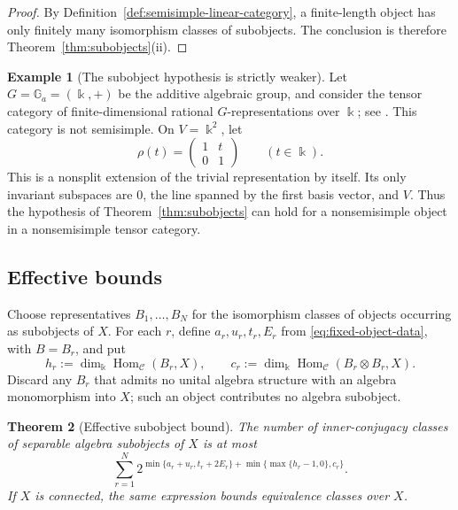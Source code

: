 \documentclass[11pt]{amsart}
\newtheorem{theorem}{Theorem}[section]
\theoremstyle{definition}
\newtheorem{example}[theorem]{Example}
\theoremstyle{remark}
\newcommand{\C}{\mathcal C}
\newcommand{\kk}{\Bbbk}
\DeclareMathOperator{\Hom}{Hom}
\begin{document}
\begin{proof}
By Definition~\ref{def:semisimple-linear-category}, a finite-length object
has only finitely many isomorphism classes of subobjects.  The conclusion is
therefore Theorem~\ref{thm:subobjects}\textup{(ii)}.
\end{proof}

\begin{example}[The subobject hypothesis is strictly weaker]\label{ex:strict-subobject}
Let $G=\mathbb G_a=(\kk,+)$ be the additive algebraic group, and consider
the tensor category of finite-dimensional rational $G$-representations over
$\kk$; see \cite[\S{}I.2]{Jantzen}.  This category is not semisimple.  On
$V=\kk^2$, let
\[
 \rho(t)=\begin{pmatrix}1&t\\0&1\end{pmatrix}\qquad(t\in\kk).
\]
This is a nonsplit extension of the trivial representation by itself.  Its
only invariant subspaces are $0$, the line spanned by the first basis vector,
and $V$.  Thus the hypothesis of Theorem~\ref{thm:subobjects} can hold for a
nonsemisimple object in a nonsemisimple tensor category.
\end{example}

\subsection*{Effective bounds}

Choose representatives $B_1,\ldots,B_N$ for the isomorphism classes of
objects occurring as subobjects of $X$.  For each $r$, define
$a_r,u_r,t_r,E_r$ from \eqref{eq:fixed-object-data}, with $B=B_r$, and put
\begin{equation}\label{eq:subobject-data}
 h_r:=\dim_{\kk}\Hom_{\C}(B_r,X),
 \qquad
 c_r:=\dim_{\kk}\Hom_{\C}(B_r\otimes B_r,X).
\end{equation}
Discard any $B_r$ that admits no unital algebra structure with an algebra
monomorphism into $X$; such an object contributes no algebra subobject.

\begin{theorem}[Effective subobject bound]\label{thm:subobject-bound}
The number of inner-conjugacy classes of separable algebra subobjects of
$X$ is at most
\begin{equation}\label{eq:subobject-bound}
 \sum_{r=1}^N
 2^{\min\{a_r+u_r,t_r+2E_r\}+\min\{\max\{h_r-1,0\},c_r\}}.
\end{equation}
If $X$ is connected, the same expression bounds equivalence classes over
$X$.
\end{theorem}
\end{document}
